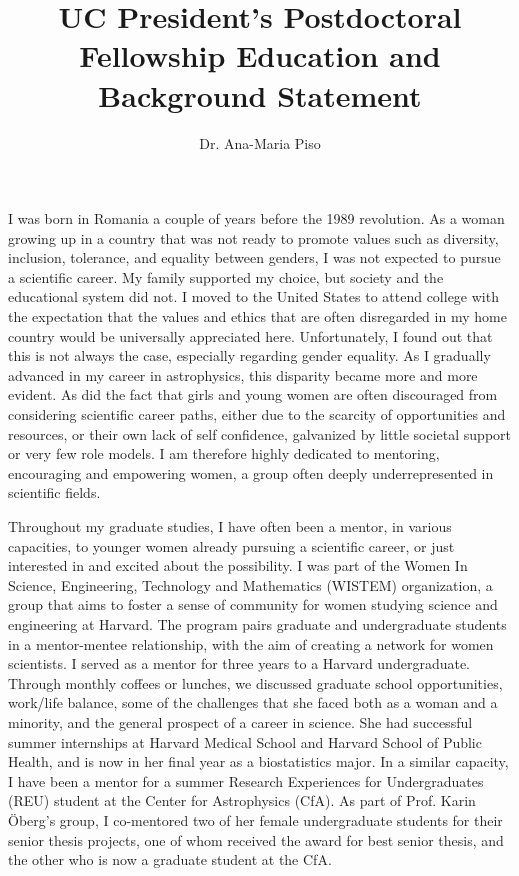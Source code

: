 \documentclass[12pt, letterpaper]{article}
\date{}
\title{\Large UC President's Postdoctoral Fellowship Education and Background Statement}
\author{Dr. Ana-Maria Piso}
\begin{document}
\maketitle


\vspace{-0.9cm}

I was born in Romania a couple of years before the 1989 revolution. As a woman growing up in a country that was not ready to promote values such as diversity, inclusion, tolerance, and equality between genders, I was not expected to pursue a scientific career. My family supported my choice, but society and the educational system did not. I moved to the United States to attend college with the expectation that the values and ethics that are often disregarded in my home country would be universally appreciated here. Unfortunately, I found out that this is not always the case, especially regarding gender equality. As I gradually advanced in my career in astrophysics, this disparity became more and more evident. As did the fact that girls and young women are often discouraged from considering scientific career paths, either due to the scarcity of opportunities and resources, or their own lack of self confidence, galvanized by little societal support or very few role models. I am therefore highly dedicated to mentoring, encouraging and empowering women, a group often deeply underrepresented in scientific fields.  

Throughout my graduate studies, I have often been a mentor, in various capacities, to younger women already pursuing a scientific career, or just interested in and excited about the possibility. I was part of the Women In Science, Engineering, Technology and Mathematics (WISTEM) organization, a group that aims to foster a sense of community for women studying science and engineering at Harvard. The program pairs graduate and undergraduate students in a mentor-mentee relationship, with the aim of creating a network for women scientists. I served as a mentor for three years to a Harvard undergraduate. Through monthly coffees or lunches, we discussed graduate school opportunities, work/life balance, some of the challenges that she faced both as a woman and a minority, and the general prospect of a career in science. She had successful summer internships at Harvard Medical School and Harvard School of Public Health, and is now in her final year as a biostatistics major. In a similar capacity, I have been a mentor for a summer Research Experiences for Undergraduates (REU) student at the Center for Astrophysics (CfA). As part of Prof. Karin \"Oberg's group, I co-mentored two of her female undergraduate students for their senior thesis projects, one of whom received the award for best senior thesis, and the other who is now a graduate student at the CfA.   
\end{document}
